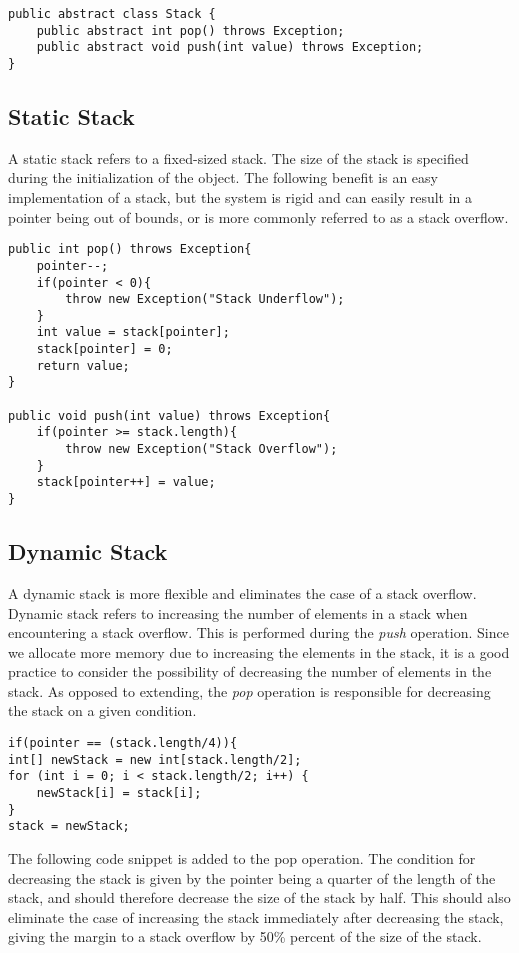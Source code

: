 \documentclass[a4paper,11pt]{article}
\begin{document}
\begin{verbatim}
public abstract class Stack {
    public abstract int pop() throws Exception;
    public abstract void push(int value) throws Exception; 
}    
\end{verbatim}
    

\subsection*{Static Stack}

    A static stack refers to a fixed-sized stack. The size of the stack is specified during the initialization of the object. The following benefit is an easy implementation of a stack, but the system is rigid and can easily result in a pointer being out of bounds, or is more commonly referred to as a stack overflow.

\begin{verbatim}
public int pop() throws Exception{
    pointer--;
    if(pointer < 0){
        throw new Exception("Stack Underflow");
    }
    int value = stack[pointer];
    stack[pointer] = 0; 
    return value;
}

public void push(int value) throws Exception{
    if(pointer >= stack.length){
        throw new Exception("Stack Overflow");
    }
    stack[pointer++] = value;
}
\end{verbatim}

\subsection*{Dynamic Stack}

    A dynamic stack is more flexible and eliminates the case of a stack overflow. Dynamic stack refers to increasing the number of elements in a stack when encountering a stack overflow. This is performed during the \textit{push} operation. Since we allocate more memory due to increasing the elements in the stack, it is a good practice to consider the possibility of decreasing the number of elements in the stack. As opposed to extending, the \textit{pop} operation is responsible for decreasing the stack on a given condition.

\begin{verbatim}
if(pointer == (stack.length/4)){
int[] newStack = new int[stack.length/2];
for (int i = 0; i < stack.length/2; i++) {
    newStack[i] = stack[i];
}
stack = newStack;
\end{verbatim}
    The following code snippet is added to the pop operation. The condition for decreasing the stack is given by the pointer being a quarter of the length of the stack, and should therefore decrease the size of the stack by half. This should also eliminate the case of increasing the stack immediately after decreasing the stack, giving the margin to a stack overflow by 50\% percent of the size of the stack.
\end{document}
